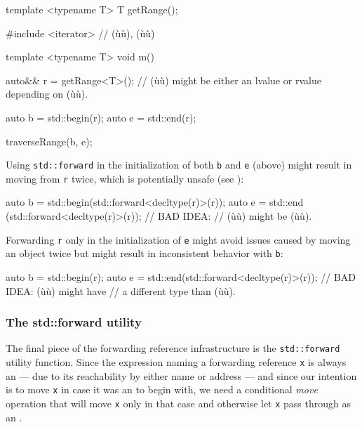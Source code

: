 \begin{emcppshiddenlisting}[emcppsbatch=e6]
template <typename T>
T getRange();
\end{emcppshiddenlisting}
\begin{emcppslisting}[emcppsbatch=e6]
#include <iterator>  // (ù{}ù), (ù{}ù)

template <typename T>
void m()
{
    auto&& r = getRange<T>();
        // (ù{}ù) might be either an lvalue or rvalue depending on (ù{}ù).

    auto b = std::begin(r);
    auto e = std::end(r);

    traverseRange(b, e);
}
\end{emcppslisting}

\noindent Using \lstinline!std::forward! in the initialization of both \lstinline!b! and
\lstinline!e! (above) might result in moving from \lstinline!r! twice, which is
potentially unsafe (see ):

\begin{emcppslisting}
auto b = std::begin(std::forward<decltype(r)>(r));  
auto e = std::end  (std::forward<decltype(r)>(r));  // BAD IDEA: 
                                                    // (ù{}ù) might be (ù{}ù).
\end{emcppslisting}

\noindent Forwarding
\lstinline!r! only in the initialization of \lstinline!e! might avoid issues
caused by moving an object twice but might result in inconsistent
behavior with \lstinline!b!:

\begin{emcppslisting}
auto b = std::begin(r);  
auto e = std::end(std::forward<decltype(r)>(r));  // BAD IDEA: (ù{}ù) might have 
                                                  // a different type than (ù{}ù).
\end{emcppslisting}

\subsubsection[The \lstinline!std::forward! utility]{The {\SubsubsecCode std::forward} utility}\label{the-std::forward-utility}

The final piece of the forwarding reference infrastructure is the
\lstinline!std::forward! utility function. Since the expression naming a
forwarding reference \lstinline!x! is always an  --- due to its
reachability by either name or address --- and since our
intention is to move \lstinline!x! in case it was an  to begin
with, we need a conditional \emph{move} operation that will move
\lstinline!x! only in that case and otherwise let \lstinline!x! pass through as
an .

